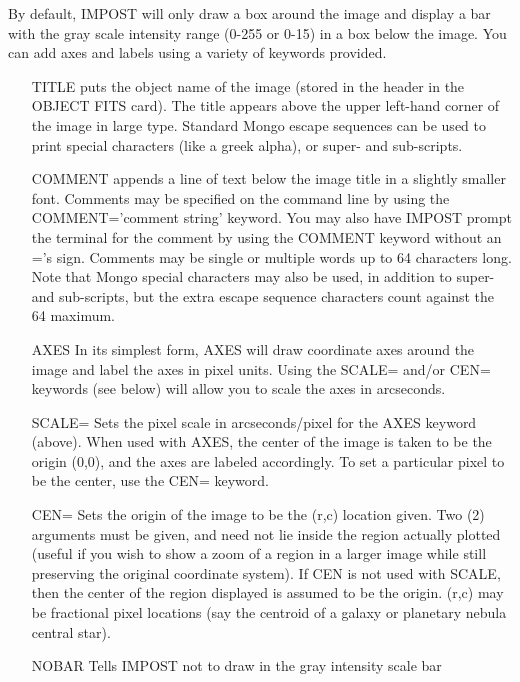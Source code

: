 By default, IMPOST will only draw a box around the image and display a bar
with the gray scale intensity range (0-255 or 0-15) in a box below the
image.  You can add axes and labels using a variety of keywords provided.
\begin{itemize}
  \item[TITLE]{puts the object name of the image (stored in the header in
          the OBJECT FITS card).  The title appears above the upper
          left-hand corner of the image in large type.  Standard 
          Mongo escape sequences can be used to print special characters
          (like a greek alpha), or super- and sub-scripts.}
  \item[COMMENT]{appends a line of text below the image title in a slightly
          smaller font.  Comments may be specified on the command line
          by using the COMMENT='comment string' keyword.  You may also
          have IMPOST prompt the terminal for the comment by using
          the COMMENT keyword without an ='s sign.  Comments may be 
          single or multiple words up to 64 characters long.  Note that
          Mongo special characters may also be used, in addition to 
          super- and sub-scripts, but the extra escape sequence characters
          count against the 64 maximum.}
  \item[AXES]{In its simplest form, AXES will draw coordinate axes around
          the image and label the axes in pixel units.  Using the
          SCALE= and/or CEN= keywords (see below) will allow you
          to scale the axes in arcseconds.}
  \item[SCALE= ]{Sets the pixel scale in arcseconds/pixel for the AXES 
          keyword (above).  When used with AXES, the center of
          the image is taken to be the origin (0,0), and the axes
          are labeled accordingly.  To set a particular pixel to be
          the center, use the CEN= keyword.}
  \item[CEN=]{Sets the origin of the image to be the (r,c) location given.
          Two (2) arguments must be given, and need not lie inside the
          region actually plotted (useful if you wish to show a zoom of
          a region in a larger image while still preserving the original
          coordinate system).  If CEN is not used with SCALE, then the
          center of the region displayed is assumed to be the origin.
          (r,c) may be fractional pixel locations (say the centroid of
          a galaxy or planetary nebula central star).}
  \item[NOBAR]{Tells IMPOST not to draw in the gray intensity scale bar
}
\end{itemize}
